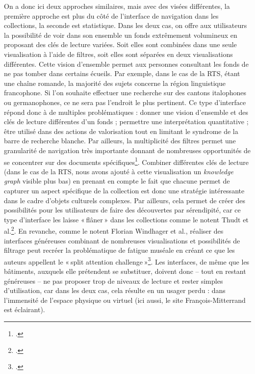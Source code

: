 On a donc ici deux approches similaires, mais avec des visées différentes, la première approche est plus du côté de l’interface de navigation dans les collections, la seconde est statistique. Dans les deux cas, on offre aux utilisateurs la possibilité de voir dans son ensemble un fonds extrêmement volumineux en proposant des clés de lecture variées. Soit elles sont combinées dans une seule visualisation à l’aide de filtres, soit elles sont séparées en deux visualisations différentes. Cette vision d'ensemble permet aux personnes consultant les fonds de ne pas tomber dans certains écueils. Par exemple, dans le cas de la RTS, étant une chaîne romande, la majorité des sujets concerne la région linguistique francophone. Si l'on souhaite effectuer une recherche sur des cantons italophones ou germanophones, ce ne sera pas l'endroit le plus pertinent. Ce type d’interface répond donc à de multiples problématiques : donner une vision d’ensemble et des clés de lecture différentes d’un fonds ; permettre une interprétation quantitative ; être utilisé dans des actions de valorisation tout en limitant le syndrome de la barre de recherche blanche. Par ailleurs, la multiplicité des filtres permet une granularité de navigation très importante donnant de nombreuses opportunités de se concentrer sur des documents spécifiques\footcite[p. 7]{windhager2018a}. Combiner différentes clés de lecture (dans le cas de la RTS, nous avons ajouté à cette visualisation un \textit{knowledge graph} visible plus bas) en prenant en compte le fait que chacune permet de capturer un aspect spécifique de la collection est donc une stratégie intéressante dans le cadre d’objets culturels complexes. Par ailleurs, cela permet de créer des possibilités pour les utilisateurs de faire des découvertes par sérendipité, car ce type d’interface les laisse « flâner » dans les collections comme le notent Thudt et al.\footcite[(cité dans)]{windhager2018a}. En revanche, comme le notent Florian Windhager et al., réaliser des interfaces généreuses combinant de nombreuses visualisations et possibilités de filtrage peut recréer la problématique de fatigue muséale en créant ce que les auteurs appellent le « split attention challenge »\footcite[p. 9]{windhager2018a}. Les interfaces, de même que les bâtiments, auxquels elle prétendent se substituer, doivent donc -- tout en restant généreuses -- ne pas proposer trop de niveaux de lecture et rester simples d’utilisation, car dans les deux cas, cela résulte en un usager perdu : dans l’immensité de l’espace physique ou virtuel (ici aussi, le site François-Mitterrand est éclairant).

